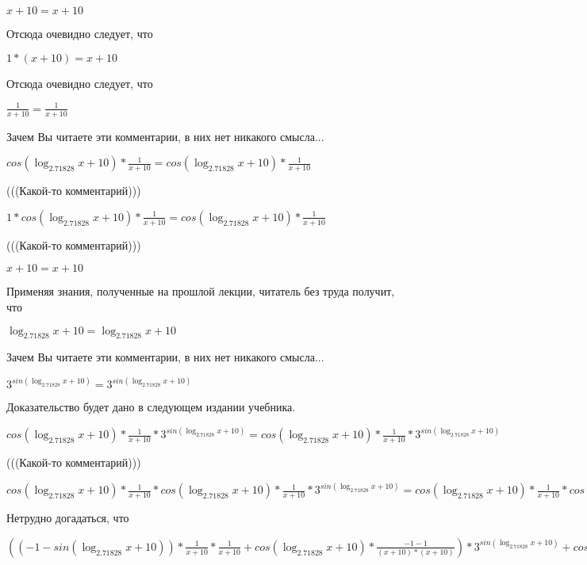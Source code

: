 \documentclass[12pt,a4paper,fleqn]{article}
\theoremstyle{definition}
\begin{document}
$ x  +  10  =  x  +  10 $

Отсюда очевидно следует, что 

$ 1  * ( x  +  10 ) =  x  +  10 $

Отсюда очевидно следует, что 

$\frac{ 1 }{ x  +  10 }
 = \frac{ 1 }{ x  +  10 }
$

Зачем Вы читаете эти комментарии, в них нет никакого смысла... 

$cos(\log_{ 2.71828 }{ x  +  10 }) * \frac{ 1 }{ x  +  10 }
 = cos(\log_{ 2.71828 }{ x  +  10 }) * \frac{ 1 }{ x  +  10 }
$

(((Какой-то комментарий))) 

$ 1  * cos(\log_{ 2.71828 }{ x  +  10 }) * \frac{ 1 }{ x  +  10 }
 = cos(\log_{ 2.71828 }{ x  +  10 }) * \frac{ 1 }{ x  +  10 }
$

(((Какой-то комментарий))) 

$ x  +  10  =  x  +  10 $

Применяя знания, полученные на прошлой лекции, читатель без труда получит, что 

$\log_{ 2.71828 }{ x  +  10 } = \log_{ 2.71828 }{ x  +  10 }$

Зачем Вы читаете эти комментарии, в них нет никакого смысла... 

${ 3 }^{sin(\log_{ 2.71828 }{ x  +  10 })} = { 3 }^{sin(\log_{ 2.71828 }{ x  +  10 })}$

Доказательство будет дано в следующем издании учебника. 

$cos(\log_{ 2.71828 }{ x  +  10 }) * \frac{ 1 }{ x  +  10 }
 * { 3 }^{sin(\log_{ 2.71828 }{ x  +  10 })} = cos(\log_{ 2.71828 }{ x  +  10 }) * \frac{ 1 }{ x  +  10 }
 * { 3 }^{sin(\log_{ 2.71828 }{ x  +  10 })}$

(((Какой-то комментарий))) 

$cos(\log_{ 2.71828 }{ x  +  10 }) * \frac{ 1 }{ x  +  10 }
 * cos(\log_{ 2.71828 }{ x  +  10 }) * \frac{ 1 }{ x  +  10 }
 * { 3 }^{sin(\log_{ 2.71828 }{ x  +  10 })} = cos(\log_{ 2.71828 }{ x  +  10 }) * \frac{ 1 }{ x  +  10 }
 * cos(\log_{ 2.71828 }{ x  +  10 }) * \frac{ 1 }{ x  +  10 }
 * { 3 }^{sin(\log_{ 2.71828 }{ x  +  10 })}$

Нетрудно догадаться, что 

$(( -1  - sin(\log_{ 2.71828 }{ x  +  10 })) * \frac{ 1 }{ x  +  10 }
 * \frac{ 1 }{ x  +  10 }
 + cos(\log_{ 2.71828 }{ x  +  10 }) * \frac{ -1  -  1 }{( x  +  10 ) * ( x  +  10 )}
) * { 3 }^{sin(\log_{ 2.71828 }{ x  +  10 })} + cos(\log_{ 2.71828 }{ x  +  10 }) * \frac{ 1 }{ x  +  10 }
 * cos(\log_{ 2.71828 }{ x  +  10 }) * \frac{ 1 }{ x  +  10 }
 * { 3 }^{sin(\log_{ 2.71828 }{ x  +  10 })} = (( -1  - sin(\log_{ 2.71828 }{ x  +  10 })) * \frac{ 1 }{ x  +  10 }
 * \frac{ 1 }{ x  +  10 }
 + cos(\log_{ 2.71828 }{ x  +  10 }) * \frac{ -1  -  1 }{( x  +  10 ) * ( x  +  10 )}
) * { 3 }^{sin(\log_{ 2.71828 }{ x  +  10 })} + cos(\log_{ 2.71828 }{ x  +  10 }) * \frac{ 1 }{ x  +  10 }
 * cos(\log_{ 2.71828 }{ x  +  10 }) * \frac{ 1 }{ x  +  10 }
 * { 3 }^{sin(\log_{ 2.71828 }{ x  +  10 })}$
\end{document}
